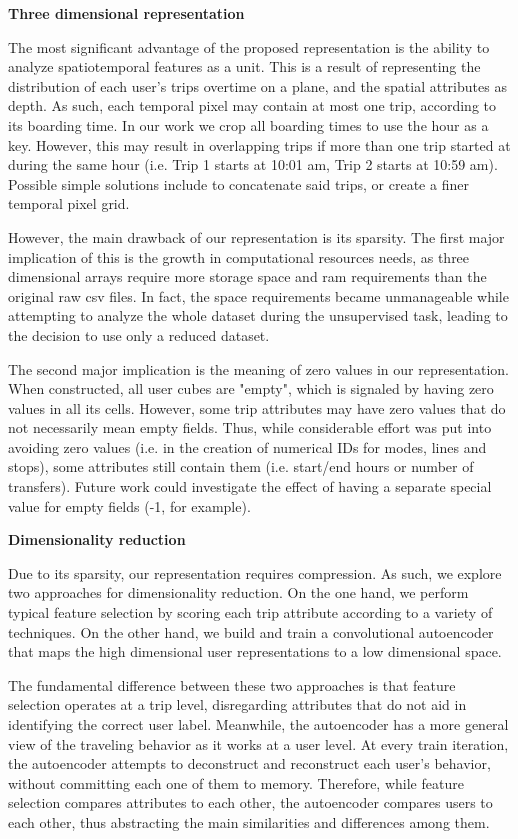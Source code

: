 \documentclass{article}
\begin{document}
\textbf{Three dimensional representation}

The most significant advantage of the proposed representation is the ability to analyze spatiotemporal features as a unit. This is a result of representing the distribution of each user's trips overtime on a plane, and the spatial attributes as depth. As such, each temporal pixel may contain at most one trip, according to its boarding time. In our work we crop all boarding times to use the hour as a key. However, this may result in overlapping trips if more than one trip started at during the same hour (i.e. Trip 1 starts at 10:01 am, Trip 2 starts at 10:59 am). Possible simple solutions include to concatenate said trips, or create a finer temporal pixel grid. 

However, the main drawback of our representation is its sparsity. The first major implication of this is the growth in computational resources needs, as three dimensional arrays require more storage space and ram requirements than the original raw csv files. In fact, the space requirements became unmanageable while attempting to analyze the whole dataset during the unsupervised task, leading to the decision to use only a reduced dataset.

The second major implication is the meaning of zero values in our representation. When constructed, all user cubes are "empty", which is signaled by having zero values in all its cells. However, some trip attributes  may have zero values that do not necessarily mean empty fields. Thus, while considerable effort was put into avoiding zero values (i.e. in the creation of numerical IDs for modes, lines and stops), some attributes still contain them (i.e. start/end hours or number of transfers). Future work could investigate the effect of having a separate special value for empty fields (-1, for example).

\textbf{Dimensionality reduction}

Due to its sparsity, our representation requires compression. As such, we explore two approaches for dimensionality reduction. On the one hand, we perform typical feature selection by scoring each trip attribute according to a variety of techniques. On the other hand, we build and train a convolutional autoencoder that maps the high dimensional user representations to a low dimensional space. 

The fundamental difference between these two approaches is that feature selection operates at a trip level, disregarding attributes that do not aid in identifying the correct user label. Meanwhile, the autoencoder has a more general view of the traveling behavior as it works at a user level. At every train iteration, the autoencoder attempts to deconstruct and reconstruct each user's behavior, without committing each one of them to memory. Therefore, while feature selection compares attributes to each other, the autoencoder compares users to each other, thus abstracting the main similarities and differences among them.
\end{document}
